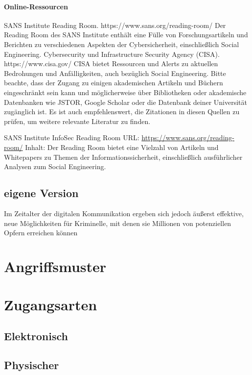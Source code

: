 \paragraph*{Online-Ressourcen}
SANS Institute Reading Room. https://www.sans.org/reading-room/ Der Reading Room des SANS Institute enthält eine Fülle von Forschungsartikeln und Berichten zu verschiedenen Aspekten der Cybersicherheit, einschließlich Social Engineering.
Cybersecurity und Infrastructure Security Agency (CISA). https://www.cisa.gov/ CISA bietet Ressourcen und Alerts zu aktuellen Bedrohungen und Anfälligkeiten, auch bezüglich Social Engineering.
Bitte beachte, dass der Zugang zu einigen akademischen Artikeln und Büchern eingeschränkt sein kann und möglicherweise über Bibliotheken oder akademische Datenbanken wie JSTOR, Google Scholar oder die Datenbank deiner Universität zugänglich ist. Es ist auch empfehlenswert, die Zitationen in diesen Quellen zu prüfen, um weitere relevante Literatur zu finden.

SANS Institute InfoSec Reading Room
URL: \url{https://www.sans.org/reading-room/}
Inhalt: Der Reading Room bietet eine Vielzahl von Artikeln und Whitepapers zu Themen der Informationssicherheit, einschließlich ausführlicher Analysen zum Social Engineering.

\subsection*{eigene Version}

Im Zeitalter der digitalen Kommunikation ergeben sich jedoch äußerst effektive, neue Möglichkeiten für Kriminelle, mit denen sie Millionen von potenziellen Opfern erreichen können\cite{bsi}


\section{Angriffsmuster}

\section{Zugangsarten}

\subsection{Elektronisch}
\subsection{Physischer}
